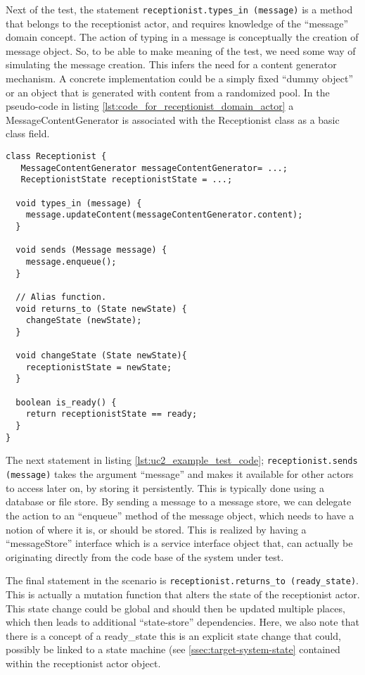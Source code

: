 \noindent Next of the test, the statement \texttt{receptionist.types\_in~(message)} is a method that belongs to the receptionist actor, and requires knowledge of the ``message'' domain concept. The action of typing in a message is conceptually the creation of message object. So, to be able to make meaning of the test, we need some way of simulating the message creation. This infers the need for a content generator mechanism. A concrete implementation could be a simply fixed ``dummy object'' or an object that is generated with content from a randomized pool. In the pseudo-code in listing \ref{lst:code_for_receptionist_domain_actor} a MessageContentGenerator is associated with the Receptionist class as a basic class field.
\begin{lstlisting}[style=Dart, caption=Pseudo code representing Receptionist domain actor,label={lst:code_for_receptionist_domain_actor}]
class Receptionist {
   MessageContentGenerator messageContentGenerator= ...;
   ReceptionistState receptionistState = ...;
  
  void types_in (message) {
  	message.updateContent(messageContentGenerator.content);
  }
  
  void sends (Message message) {
    message.enqueue();
  }
  
  // Alias function.
  void returns_to (State newState) {
  	changeState (newState);
  }
  
  void changeState (State newState){
  	receptionistState = newState;
  }
  
  boolean is_ready() {
    return receptionistState == ready;
  }
}
\end{lstlisting}
The next statement in listing \ref{lst:uc2_example_test_code}; \texttt{receptionist.sends (message)} takes the argument ``message'' and makes it available for other actors to access later on, by storing it persistently. This is typically done using a database or file store. By sending a message to a message store, we can delegate the action to an ``enqueue'' method of the message object, which needs to have a notion of where it is, or should be stored. This is realized by having a ``messageStore'' interface which is a service interface object that, can actually be originating directly from the code base of the system under test.\medskip

\noindent The final statement in the scenario is \texttt{receptionist.returns\_to (ready\_state)}. This is actually a mutation function that alters the state of the receptionist actor. This state change could be global and should then  be updated multiple places, which then leads to additional ``state-store'' dependencies. Here, we also note that there is a concept of a ready\_state this is an explicit state change that could, possibly be linked to a state machine (see \ref{ssec:target-system-state} contained within the receptionist actor object.\medskip

